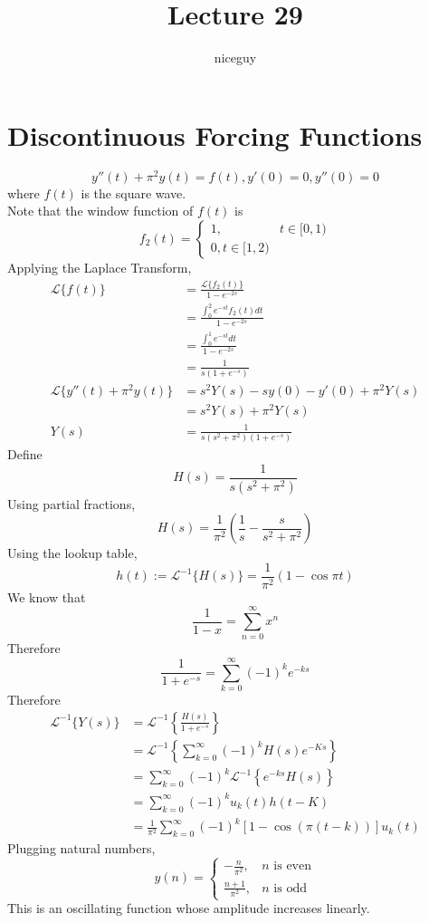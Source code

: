 \documentclass[12pt]{article}
\author{niceguy}
\title{Lecture 29}
\begin{document}
\maketitle

\section{Discontinuous Forcing Functions}

\begin{ex}
	$$y''(t) + \pi^2y(t) = f(t), y'(0) = 0, y''(0) = 0$$
	where $f(t)$ is the square wave. \\
	Note that the window function of $f(t)$ is
	$$f_2(t) = \begin{cases} 1, & t \in[0,1) \\ 0, t \in [1,2) \end{cases}$$
	Applying the Laplace Transform,
	\begin{align*}
		\mathcal{L}\{f(t)\} &= \frac{\mathcal{L}\{f_2(t)\}}{1-e^{-2s}} \\
				    &= \frac{\int_0^2e^{-st}f_2(t)dt}{1-e^{-2s}} \\
				    &= \frac{\int_0^1e^{-st}dt}{1-e^{-2s}} \\
				    &= \frac{1}{s(1+e^{-s})} \\
		\mathcal{L}\{y''(t) + \pi^2y(t)\} &= s^2Y(s) - sy(0) - y'(0) + \pi^2Y(s) \\
						  &= s^2Y(s) + \pi^2Y(s) \\
		Y(s) &= \frac{1}{s(s^2+\pi^2)(1+e^{-s})}
	\end{align*}
	Define
	$$H(s) = \frac{1}{s(s^2+\pi^2)}$$
	Using partial fractions,
	$$H(s) = \frac{1}{\pi^2}\left(\frac{1}{s} - \frac{s}{s^2+\pi^2}\right)$$
	Using the lookup table,
	$$h(t) := \mathcal{L}^{-1}\{H(s)\} = \frac{1}{\pi^2}(1-\cos\pi t)$$
	We know that
	$$\frac{1}{1-x} = \sum_{n=0}^\infty x^n$$
	Therefore
	$$\frac{1}{1+e^{-s}} = \sum_{k=0}^\infty(-1)^ke^{-ks}$$
	Therefore
	\begin{align*}
		\mathcal{L}^{-1}\{Y(s)\} &= \mathcal{L}^{-1}\left\{\frac{H(s)}{1+e^{-s}}\right\} \\
					 &= \mathcal{L}^{-1}\left\{\sum_{k=0}^\infty(-1)^kH(s)e^{-Ks}\right\} \\
					 &= \sum_{k=0}^\infty(-1)^k\mathcal{L}^{-1}\left\{e^{-ks}H(s)\right\} \\
					 &= \sum_{k=0}^\infty(-1)^ku_k(t)h(t-K) \\
					 &= \frac{1}{\pi^2}\sum_{k=0}^\infty(-1)^k[1-\cos(\pi(t-k))]u_k(t)
	\end{align*}
	Plugging natural numbers,
	$$y(n) = \begin{cases} -\frac{n}{\pi^2}, & n \text{ is even} \\ \frac{n+1}{\pi^2}, & n \text{ is odd}\end{cases}$$
	This is an oscillating function whose amplitude increases linearly.
\end{ex}
\end{document}
